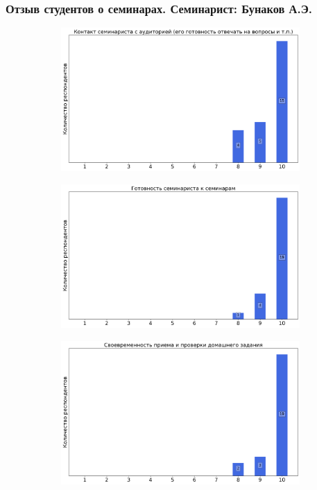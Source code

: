     \subsubsection{Отзыв студентов о семинарах. Семинарист: Бунаков А.Э.}
		\begin{figure}[H]
			\centering
			\begin{subfigure}[b]{0.45\textwidth}
				\centering
				\includegraphics[width=\textwidth]{images/3 course/ТФКП/seminarists-marks-Бунаков А.Э.-0.png}
			\end{subfigure}
			\begin{subfigure}[b]{0.45\textwidth}
				\centering
				\includegraphics[width=\textwidth]{images/3 course/ТФКП/seminarists-marks-Бунаков А.Э.-1.png}
			\end{subfigure}
			\begin{subfigure}[b]{0.45\textwidth}
				\centering
				\includegraphics[width=\textwidth]{images/3 course/ТФКП/seminarists-marks-Бунаков А.Э.-2.png}

\end{subfigure}
\end{figure}
